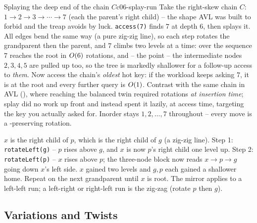 \begin{example}{Splaying the deep end of the chain $C$}{c06-splay-run}
Take the right-skew chain $C$: $1\to2\to3\to\cdots\to7$ (each the parent's right child) -- the shape AVL
was built to forbid and the treap avoids by luck. \texttt{access(7)} finds $7$ at depth $6$, then splays
it. All edges bend the same way (a pure zig-zig line), so each step rotates the grandparent then the
parent, and $7$ climbs two levels at a time: over the sequence $7$ reaches the root in $O(6)$
rotations, and -- the point -- the intermediate nodes $2,3,4,5$ are pulled up too, so the tree is markedly
shallower for a follow-up access to \emph{them}. Now access the chain's \emph{oldest} hot key: if the
workload keeps asking $7$, it is at the root and every further query is $O(1)$. Contrast with the same
chain in AVL (), where reaching the balanced twin required rotations \emph{at
insertion time}; splay did no work up front and instead spent it lazily, at access time, targeting the key
you actually asked for. Inorder stays $1,2,\dots,7$ throughout -- every move is a
-preserving rotation.
\end{example}

\begin{tracebox}
$x$ is the right child of $p$, which is the right child of $g$ (a zig-zig line). Step 1:
\texttt{rotateLeft(g)} -- $p$ rises above $g$, and $x$ is now $p$'s right child one level up. Step 2:
\texttt{rotateLeft(p)} -- $x$ rises above $p$; the three-node block now reads $x\to p\to g$ going down
$x$'s left side. $x$ gained two levels and $g,p$ each gained a shallower home. Repeat on the next grandparent
until $x$ is root. The mirror applies to a left-left run; a left-right or right-left run is the zig-zag
(rotate $p$ then $g$). \checkmark
\end{tracebox}

\subsection{Variations and Twists}

